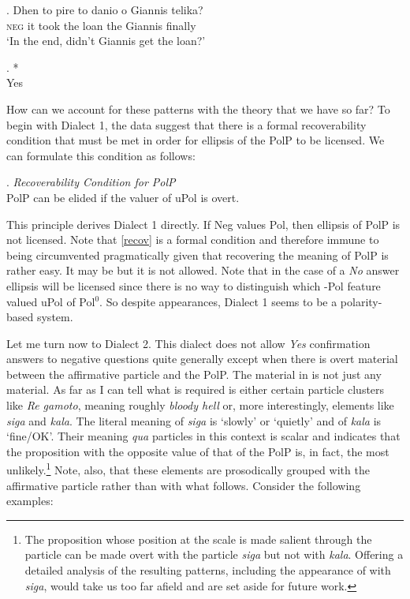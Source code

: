 \documentclass[output=paper]{LSP/langsci}
\begin{document}
\exg.
Dhen to pire to danio o Giannis telika?\\
\textsc{neg} it took the loan the Giannis finally\\   \label{nq3}
\glt `In the end, didn't Giannis get the loan?'

\exg.
*\nai\\
Yes\\ \label{nq4}

How can we account for these patterns with the theory that we have so far?  To begin with Dialect 1, the data suggest that there is a formal recoverability condition that must be met in order for ellipsis of the PolP to be licensed.  We can formulate this condition as follows:

\Lsciex. \label{recov}
\textit{Recoverability Condition for PolP}\\
PolP can be elided if the valuer of uPol is overt.

This principle derives Dialect 1 directly.  If Neg values Pol, then ellipsis of PolP is not licensed.  Note that \ref{recov} is a formal condition and therefore immune to being circumvented pragmatically given that recovering the meaning of PolP is rather easy.  It may be but it is not allowed.  Note that in the case of a \textit{No} answer ellipsis will be licensed since there is no way to distinguish which -Pol feature valued uPol of Pol$^0$.   So despite appearances, Dialect 1 seems to be a polarity-based system.

Let me turn now to Dialect 2. This dialect does not allow \textit{Yes} confirmation  answers to negative questions quite generally except when there is overt material between the affirmative particle and the PolP.  The material in  is not just any material.  As far as I can tell what is required is either certain particle clusters like \textit{Re gamoto}, meaning roughly \textit{bloody hell} or, more interestingly, elements like \textit{siga} and \textit{kala}.  The literal meaning of \textit{siga} is `slowly' or `quietly' and of \textit{kala} is `fine/OK'.   Their meaning \textit{qua} particles in this context is scalar and indicates that the proposition with the opposite  value of that of the PolP is, in fact, the most unlikely.\footnote{The proposition whose position at the scale is made salient through the particle can be made overt with the particle \textit{siga} but not with \textit{kala}.  Offering a detailed analysis of the resulting patterns, including the appearance of   with \textit{siga}, would take us too far afield and are set aside for future work.}
Note, also, that these elements are prosodically grouped with the affirmative particle rather than with what follows. Consider the following examples:
 
\end{document}
